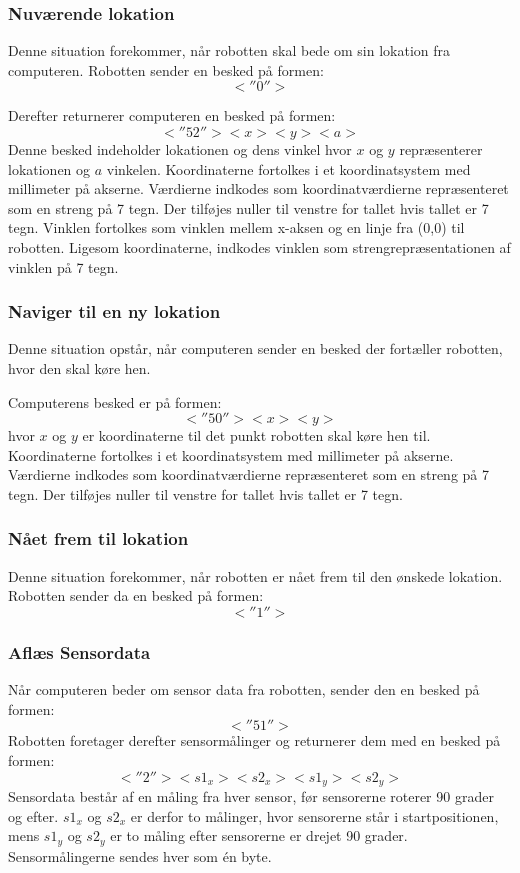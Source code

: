\subsubsection{Nuværende lokation}\label{protokol:positur}
Denne situation forekommer, når robotten skal bede om sin lokation fra computeren.
Robotten sender en besked på formen:
\[
< \! ''0'' \! >
\]


Derefter returnerer computeren en besked på formen:
\[< \! ''52'' \!><x><y><a>\]
Denne besked indeholder lokationen og dens vinkel hvor $x$ og $y$ repræsenterer lokationen og $a$ vinkelen.
Koordinaterne fortolkes i et koordinatsystem med millimeter på akserne.
Værdierne indkodes som koordinatværdierne repræsenteret som en streng på 7 tegn.
Der tilføjes nuller til venstre for tallet hvis tallet er 7 tegn.
Vinklen fortolkes som vinklen mellem x-aksen og en linje fra (0,0) til robotten.
Ligesom koordinaterne, indkodes vinklen som strengrepræsentationen af vinklen på 7 tegn.

\subsubsection{Naviger til en ny lokation}\label{design:protokol_navigertilny}
Denne situation opstår, når computeren sender en besked der fortæller robotten, hvor den skal køre hen.

Computerens besked er på formen:
 \[<\! ''50'' \!><x><y>\] 
hvor $x$ og $y$ er koordinaterne til det punkt robotten skal køre hen til.
Koordinaterne fortolkes i et koordinatsystem med millimeter på akserne.
Værdierne indkodes som koordinatværdierne repræsenteret som en streng på 7 tegn.
Der tilføjes nuller til venstre for tallet hvis tallet er 7 tegn.

\subsubsection{Nået frem til lokation}
Denne situation forekommer, når robotten er nået frem til den ønskede lokation.
Robotten sender da en besked på formen: \[<\!''1''\!>\]

\subsubsection{Aflæs Sensordata}
Når computeren beder om sensor data fra robotten, sender den en besked på formen: \[<\!''51''\!>\]
Robotten foretager derefter sensormålinger og returnerer dem med en besked på formen:
\[<\!''2''\!><s1_x> <s2_x> <s1_y> <s2_y>\]
Sensordata består af en måling fra hver sensor, før sensorerne roterer 90 grader og efter.
$ s1_x $ og $ s2_x $ er derfor to målinger, hvor sensorerne står i startpositionen, mens $ s1_y $ og $ s2_y $ er to måling efter sensorerne er drejet 90 grader.
Sensormålingerne sendes hver som én byte.